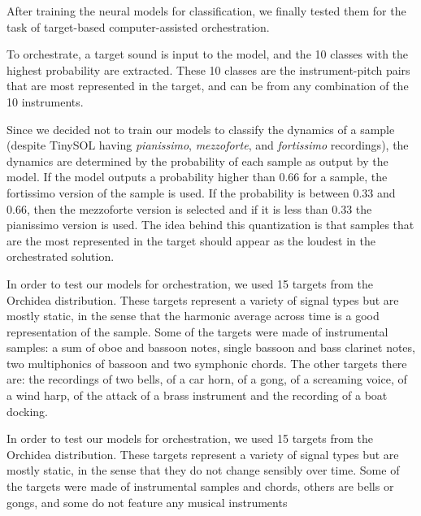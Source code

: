 \documentclass[runningheads,a4paper]{llncs}
\begin{document}
After training the neural models for classification, we finally tested them for the task of target-based computer-assisted orchestration. 

To orchestrate, a target sound is input to the model, and the 10 classes with the highest probability are extracted. These 10 classes are the instrument-pitch pairs that are most represented in the target, and can be from any combination of the 10 instruments. 

Since we decided not to train our models to classify the dynamics of a sample (despite TinySOL having \emph{pianissimo}, \emph{mezzoforte}, and \emph{fortissimo} recordings), the dynamics are determined by the probability of each sample as output by the model. If the model outputs a probability higher than $0.66$ for a sample, the fortissimo version of the sample is used. If the probability is between $0.33$ and $0.66$, then the mezzoforte version is selected and if it is less than $0.33$ the pianissimo version is used. The idea behind this quantization is that samples that are the most represented in the target should appear as the loudest in the orchestrated solution.

In order to test our models for orchestration, we used 15 targets from the Orchidea distribution. These targets represent a variety of signal types but are mostly static, in the sense that the harmonic average across time is a good representation of the sample. Some of the targets were made of instrumental samples: a sum of oboe and bassoon notes, single bassoon and bass clarinet notes, two multiphonics of bassoon and two symphonic chords. The other targets there are: the recordings of two bells, of a car horn, of a gong, of a screaming voice, of a wind harp, of the attack of a brass instrument and the recording of a boat docking.

In order to test our models for orchestration, we used 15 targets from the Orchidea distribution. These targets represent a variety of signal types but are mostly static, in the sense that they do not change sensibly over time. Some of the targets were made of instrumental samples and chords, others are bells or gongs, and some do not feature any musical instruments
\end{document}
